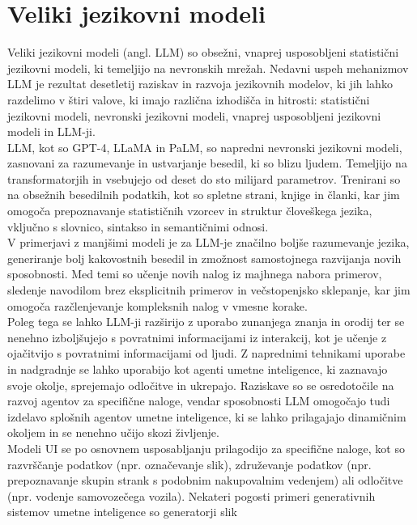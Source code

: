\documentclass[a4paper,12pt,openright]{book}
\begin{document}
\section{Veliki jezikovni modeli}
Veliki jezikovni modeli (angl. LLM) so obsežni, vnaprej usposobljeni statistični jezikovni modeli, ki temeljijo na nevronskih mrežah. Nedavni uspeh mehanizmov LLM je rezultat desetletij raziskav in razvoja jezikovnih modelov, ki jih lahko razdelimo v štiri valove, ki imajo različna izhodišča in hitrosti: statistični jezikovni modeli, nevronski jezikovni modeli, vnaprej usposobljeni jezikovni modeli in LLM-ji.\cite{minaee2024largelanguagemodelssurvey} \\
LLM, kot so GPT-4, LLaMA in PaLM, so napredni nevronski jezikovni modeli, zasnovani za razumevanje in ustvarjanje besedil, ki so blizu ljudem. Temeljijo na transformatorjih in vsebujejo od deset do sto milijard parametrov. Trenirani so na obsežnih besedilnih podatkih, kot so spletne strani, knjige in članki, kar jim omogoča prepoznavanje statističnih vzorcev in struktur človeškega jezika, vključno s slovnico, sintakso in semantičnimi odnosi.\cite{10.1145/3520312.3534862} \\
V primerjavi z manjšimi modeli je za LLM-je značilno boljše razumevanje jezika, generiranje bolj kakovostnih besedil in zmožnost samostojnega razvijanja novih sposobnosti. Med temi so učenje novih nalog iz majhnega nabora primerov, sledenje navodilom brez eksplicitnih primerov in večstopenjsko sklepanje, kar jim omogoča razčlenjevanje kompleksnih nalog v vmesne korake. \cite{minaee2024largelanguagemodelssurvey} \\
Poleg tega se lahko LLM-ji razširijo z uporabo zunanjega znanja in orodij ter se nenehno izboljšujejo s povratnimi informacijami iz interakcij, kot je učenje z ojačitvijo s povratnimi informacijami od ljudi. Z naprednimi tehnikami uporabe in nadgradnje se lahko uporabijo kot agenti umetne inteligence, ki zaznavajo svoje okolje, sprejemajo odločitve in ukrepajo. Raziskave so se osredotočile na razvoj agentov za specifične naloge, vendar sposobnosti LLM omogočajo tudi izdelavo splošnih agentov umetne inteligence, ki se lahko prilagajajo dinamičnim okoljem in se nenehno učijo skozi življenje.
\cite{minaee2024largelanguagemodelssurvey} \\
Modeli UI se po osnovnem usposabljanju prilagodijo za specifične naloge, kot so razvrščanje podatkov (npr. označevanje slik), združevanje podatkov (npr. prepoznavanje skupin strank s podobnim nakupovalnim vedenjem) ali
odločitve (npr. vodenje samovozečega vozila). Nekateri pogosti primeri generativnih sistemov umetne inteligence so generatorji slik
\end{document}
